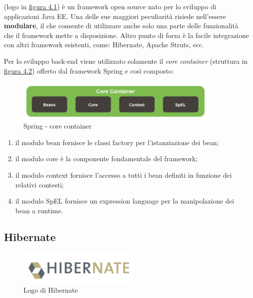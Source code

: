 \ap{{[b]}} (logo in {\hyperref[fig:spring]{figura 4.1}}) è un framework open source nato per lo sviluppo di applicazioni Java EE. Una delle sue maggiori peculiarità risiede nell'essere \textbf{modulare}, il che consente di utilizzare anche solo una parte delle funzionalità che il framework mette a disposizione. Altro punto di forza è la facile integrazione con altri framework esistenti, come: Hibernate, Apache Struts, ecc. 

\setlength{\parskip}{3ex}

\noindent Per lo sviluppo back-end viene utilizzato solamente il  \textit{core container} (struttura in {\hyperref[fig:coreSpring]{figura 4.2}}) offerto dal framework Spring e così composto:

\begin{figure}[!h]
	\centering
	\includegraphics[width=10cm]{../images/Spring-core.png}
	\caption{Spring - core container}
	\label{fig:coreSpring}
\end{figure}

\begin{enumerate}
\item il modulo bean fornisce le classi factory per l’istanziazione dei bean;
\item il modulo core è la componente fondamentale del framework;
\item il modulo context fornisce l’accesso a tutti i bean definiti in funzione dei relativi contesti;
\item il modulo SpEL fornisce un expression language per la manipolazione dei bean a runtime.
\end{enumerate}

\pagebreak

\subsection{Hibernate}

\begin{figure}[!h]
	\centering
	\includegraphics[width=6cm]{../images/Hibernate-logo.png}
	\caption{Logo di Hibernate}
	\label{fig:hibernate}
\end{figure}

